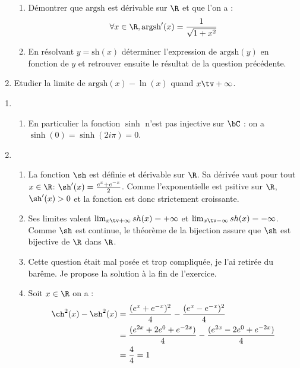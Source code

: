 \begin{exercice}
\begin{enumerate}
\begin{enumerate}
\item Démontrer que $\mathrm{argsh} $ est dérivable sur $\R$ et que l'on a :
$$\forall x\in \R, \mathrm{argsh}'(x) = \frac{1}{\sqrt{1+x^2}}$$

\item En résolvant $y=\mathrm{sh}(x)$ déterminer l'expression de $\mathrm{argsh}(y)$ en fonction de $y$ et retrouver ensuite  le résultat de la question précédente. 
\end{enumerate}
\item Etudier la limite de $\mathrm{argsh}(x) - \ln(x)$ quand $x \tv +\infty$. 
\end{enumerate}
\end{exercice}

\begin{correction}
\begin{enumerate}
\item 
\begin{enumerate}
Soit $z$ un imaginaire pur, il existe donc $\theta \in \R$ tel que $z=i\theta$. On a alors 
$\sinh(z) = \sinh(i\theta) = \frac{e^{i\theta}  - e^{-i\theta} }{2} = i\sin(\theta)$ d'après les formules d'Euler. 
\item En particulier la fonction $\sinh$ n'est pas injective sur $\bC$ : on  a  
$\sinh(0 ) = \sinh(2i\pi)=0$. 


\end{enumerate}
\item 
\begin{enumerate}
\item  La fonction $\sh$ est définie et dérivable sur $\R$. Sa dérivée vaut pour tout $x\in \R$:  $\sh'(x) =\frac{e^x+e^{-x}}{2}$. Comme l'exponentielle est psitive sur $\R$, $\sh'(x)>0$ et la fonction est donc strictement croissante. 
\item Ses limites valent $ \lim_{x\tv +\infty} sh(x)= +\infty$ et $ \lim_{x\tv -\infty} sh(x)= -\infty$. Comme $\sh$  est continue, le théorème de la bijection assure que $\sh$ est bijective de $\R$ dans $\R$. 

\item Cette question était mal posée et trop compliquée, je l'ai retirée du barême. Je propose la solution à la fin de l'exercice. 

\item Soit $x\in \R$ on a :
\begin{align*}
\ch^2(x)-\sh^2(x)&= \frac{(e^x+e^{-x})^2}{4}-\frac{(e^x-e^{-x})^2}{4}\\
							&= \frac{(e^{2x}+2e^0+e^{-2x})}{4}-\frac{(e^{2x}-2e^0 +e^{-2x})}{4}\\
					&= \frac{4}{4}=1
\end{align*}


\end{enumerate}
\end{enumerate}
\end{correction}
